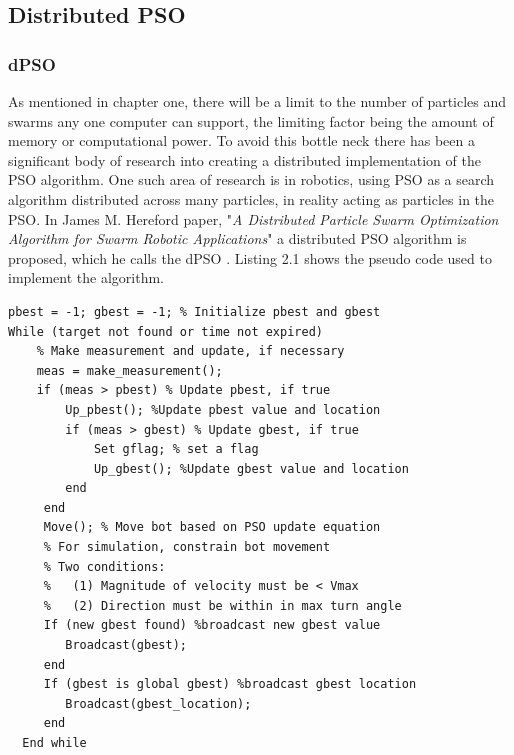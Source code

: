 \documentclass[oneside,12pt]{book}
\begin{document}
\subsection{Distributed PSO}
\subsubsection{dPSO}
As mentioned in chapter one, there will be a limit to the number of particles and swarms any one computer can support, the limiting factor being the amount of memory or computational power. To avoid this bottle neck there has been a significant body of research into creating a distributed implementation of the PSO algorithm.  One such area of research is in robotics, using PSO as a search algorithm distributed across many particles, in reality acting as particles in the PSO. In James M. Hereford paper, "\textit{A Distributed Particle Swarm Optimization Algorithm for Swarm Robotic Applications}" a distributed PSO algorithm is proposed, which he calls the dPSO \cite{hereford_2006}. Listing 2.1 shows the pseudo code used to implement the algorithm. 

\begin{lstlisting}[language=inform, caption=Herefords dPSO Code Flow]
pbest = -1; gbest = -1; % Initialize pbest and gbest 
While (target not found or time not expired) 
	% Make measurement and update, if necessary 
    meas = make_measurement();  
    if (meas > pbest) % Update pbest, if true
    	Up_pbest(); %Update pbest value and location
        if (meas > gbest) % Update gbest, if true
        	Set gflag; % set a flag 
            Up_gbest(); %Update gbest value and location
        end 
     end 
     Move(); % Move bot based on PSO update equation  
     % For simulation, constrain bot movement 
     % Two conditions: 
     %   (1) Magnitude of velocity must be < Vmax 
     %   (2) Direction must be within in max turn angle
     If (new gbest found) %broadcast new gbest value       
     	Broadcast(gbest);  
     end
     If (gbest is global gbest) %broadcast gbest location      
     	Broadcast(gbest_location);  
     end
  End while
\end{lstlisting}
\end{document}
